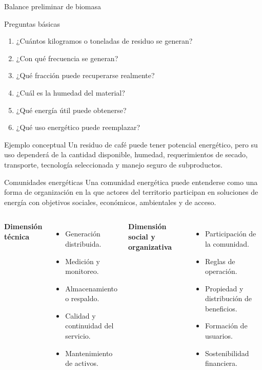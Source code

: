 \documentclass[aspectratio=169,10pt]{beamer}
\begin{document}
\begin{frame}{Balance preliminar de biomasa}
\begin{block}{Preguntas básicas}
\begin{enumerate}
    \item ¿Cuántos kilogramos o toneladas de residuo se generan?
    \item ¿Con qué frecuencia se generan?
    \item ¿Qué fracción puede recuperarse realmente?
    \item ¿Cuál es la humedad del material?
    \item ¿Qué energía útil puede obtenerse?
    \item ¿Qué uso energético puede reemplazar?
\end{enumerate}
\end{block}

\begin{exampleblock}{Ejemplo conceptual}
Un residuo de café puede tener potencial energético, pero su uso dependerá de la cantidad disponible, humedad, requerimientos de secado, transporte, tecnología seleccionada y manejo seguro de subproductos.
\end{exampleblock}
\end{frame}

\begin{frame}{Comunidades energéticas}
Una comunidad energética puede entenderse como una forma de organización en la que actores del territorio participan en soluciones de energía con objetivos sociales, económicos, ambientales y de acceso.

\vspace{0.3cm}

\begin{columns}
\textbf{Dimensión técnica}
\begin{itemize}
    \item Generación distribuida.
    \item Medición y monitoreo.
    \item Almacenamiento o respaldo.
    \item Calidad y continuidad del servicio.
    \item Mantenimiento de activos.
\end{itemize}

\textbf{Dimensión social y organizativa}
\begin{itemize}
    \item Participación de la comunidad.
    \item Reglas de operación.
    \item Propiedad y distribución de beneficios.
    \item Formación de usuarios.
    \item Sostenibilidad financiera.
\end{itemize}
\end{columns}
\end{frame}
\end{document}
